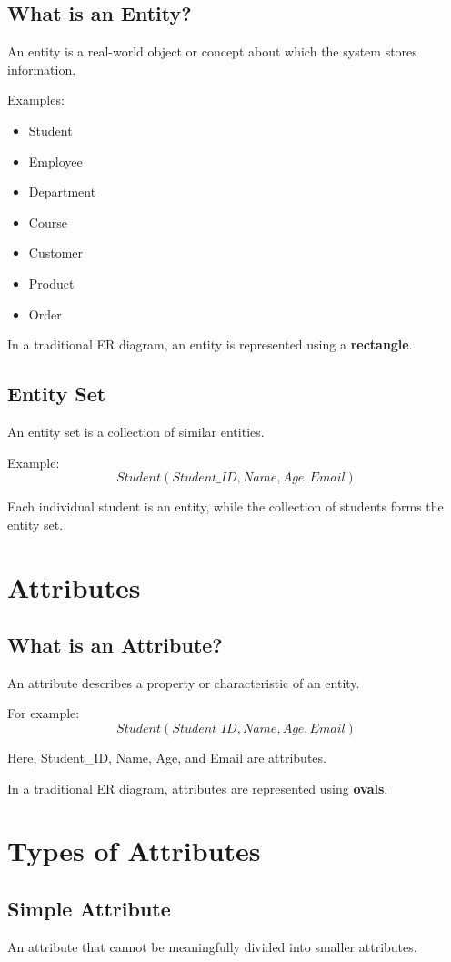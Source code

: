 \documentclass[12pt,a4paper]{article}
\begin{document}
\subsection{What is an Entity?}
An entity is a real-world object or concept about which the system stores information.

Examples:
\begin{itemize}
\item Student
\item Employee
\item Department
\item Course
\item Customer
\item Product
\item Order
\end{itemize}

In a traditional ER diagram, an entity is represented using a \textbf{rectangle}.

\subsection{Entity Set}
An entity set is a collection of similar entities.

Example:
\[
Student(Student\_ID, Name, Age, Email)
\]

Each individual student is an entity, while the collection of students forms the entity set.

\section{Attributes}

\subsection{What is an Attribute?}
An attribute describes a property or characteristic of an entity.

For example:
\[
Student(Student\_ID, Name, Age, Email)
\]

Here, Student\_ID, Name, Age, and Email are attributes.

In a traditional ER diagram, attributes are represented using \textbf{ovals}.

\section{Types of Attributes}

\subsection{Simple Attribute}
An attribute that cannot be meaningfully divided into smaller attributes.
\end{document}
